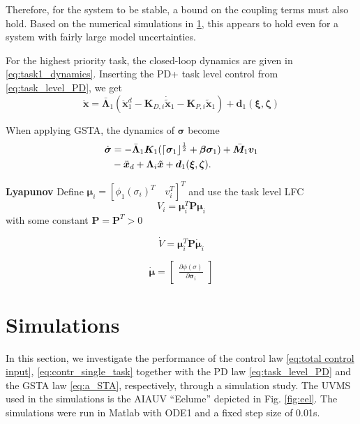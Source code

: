 \documentclass[../main.tex]{subfiles}
\begin{document}
Therefore, for the system to be stable, a bound on the coupling terms must also hold. Based on the numerical simulations in \cref{sec:sim}, this appears to hold even for a system with fairly large model uncertainties.

For the highest priority task, the closed-loop dynamics are given in \eqref{eq:task1_dynamics}. Inserting the PD+ task level control from \eqref{eq:task_level_PD}, we get
\begin{equation}
    \label{eq:task1_dyanmics_PD}
    \ddot{\bm{x}} =
    \bar{\bm{\Lambda}}_1(\ddot{\bm{x}}_1^d
    - \bm{K}_{D,i} \dot{\tilde{\bm{x}}}_1
    - \bm{K}_{P,i} \tilde{\bm{x}}_1)
    + \bm{d}_1(\bm{\xi}, \bm{\zeta})
\end{equation}

When applying GSTA, the dynamics of $\bm{\sigma}$ become
\begin{equation}
    \begin{aligned}
    \label{eq:task1_dynamics_STA}
    \dot{\bm{\sigma}} &=
    -\bar{\bm{\Lambda}}_1\bm{K}_1(\lceil\bm{\sigma}_1\rfloor^{\frac{1}{2}} + \bm{\beta}\bm{\sigma}_1)
    + \bar{\bm{M}}_1\bm{v}_1 \\
    &- \ddot{\bm{x}}_d + \bm{\Lambda}_i\tilde{\bm{x}}
    + \bm{d}_1(\bm{\xi}, \bm{\zeta}).
    \end{aligned}
\end{equation}

\textbf{Lyapunov }
Define $\bm{\mu}_i = [\phi_1(\sigma_i)^T \quad v_i^T]^T$ and use the task level LFC
\begin{equation}
    V_i = \bm{\mu}_i^T \bm{P} \bm{\mu}_i
\end{equation}
with some constant $\bm{P} = \bm{P}^T > 0$

\begin{equation}
    \dot{V} = \bm{\mu}_i^T \bm{P} \dot{\bm{\mu}}_i
\end{equation}

\begin{equation}
    \dot{\bm{\mu}} = \begin{bmatrix}
        \frac{\partial \phi(\sigma)}{\partial \bm{\sigma}_i}
    \end{bmatrix}
\end{equation}
\fi

\section{Simulations}
\label{sec:sim}
In this section, we investigate the performance of the control law \eqref{eq:total control input}, \eqref{eq:contr_single_task} together with the PD law \eqref{eq:task_level_PD} and the GSTA law \eqref{eq:a_STA}, respectively, through a simulation study. The UVMS used in the simulations is the AIAUV ``Eelume'' \citep{liljeback2017,schmidt-didlaukies2018} depicted in Fig. \ref{fig:eel}. The simulations were run in Matlab with ODE1 and a fixed step size of 0.01s.
\end{document}
